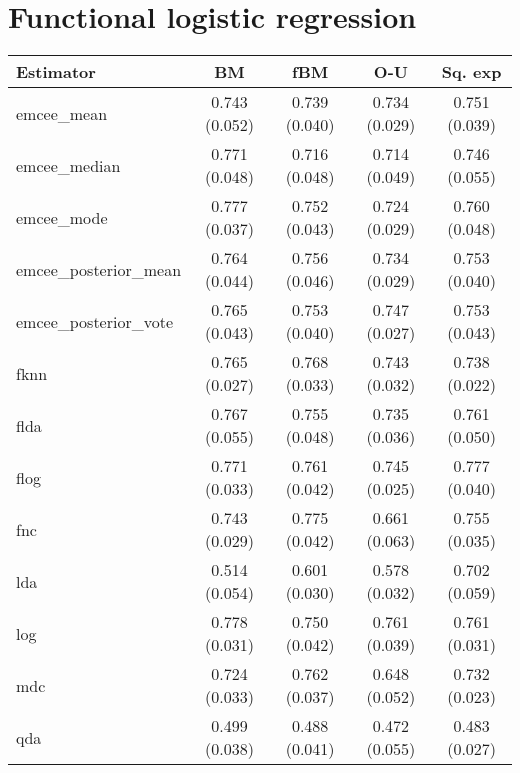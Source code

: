 \newpage

\FloatBarrier
\section*{Functional logistic regression}

\begin{table}[htbp!]
  \centering
  \begin{tabular}{lcccc}
\toprule
            \textbf{Estimator} &            \textbf{BM} &           \textbf{fBM} &           \textbf{O-U} &        \textbf{Sq. exp} \\
\midrule
          emcee\_mean & 0.743 (0.052) &       0.739 (0.040) &      0.734 (0.029) & 0.751 (0.039) \\
        emcee\_median & 0.771 (0.048) &       0.716 (0.048) &      0.714 (0.049) & 0.746 (0.055) \\
          emcee\_mode & 0.777 (0.037) &       0.752 (0.043) &      0.724 (0.029) & 0.760 (0.048) \\
emcee\_posterior\_mean & 0.764 (0.044) &       0.756 (0.046) &      0.734 (0.029) & 0.753 (0.040) \\
emcee\_posterior\_vote & 0.765 (0.043) &       0.753 (0.040) &      0.747 (0.027) & 0.753 (0.043) \\
                fknn & 0.765 (0.027) &       0.768 (0.033) &      0.743 (0.032) & 0.738 (0.022) \\
                flda & 0.767 (0.055) &       0.755 (0.048) &      0.735 (0.036) & 0.761 (0.050) \\
                flog & 0.771 (0.033) &       0.761 (0.042) &      0.745 (0.025) & 0.777 (0.040) \\
                 fnc & 0.743 (0.029) &       0.775 (0.042) &      0.661 (0.063) & 0.755 (0.035) \\
                 lda & 0.514 (0.054) &       0.601 (0.030) &      0.578 (0.032) & 0.702 (0.059) \\
                 log & 0.778 (0.031) &       0.750 (0.042) &      0.761 (0.039) & 0.761 (0.031) \\
                 mdc & 0.724 (0.033) &       0.762 (0.037) &      0.648 (0.052) & 0.732 (0.023) \\
                 qda & 0.499 (0.038) &       0.488 (0.041) &      0.472 (0.055) & 0.483 (0.027) \\

\bottomrule
\toprule


\end{tabular}
\end{table}
